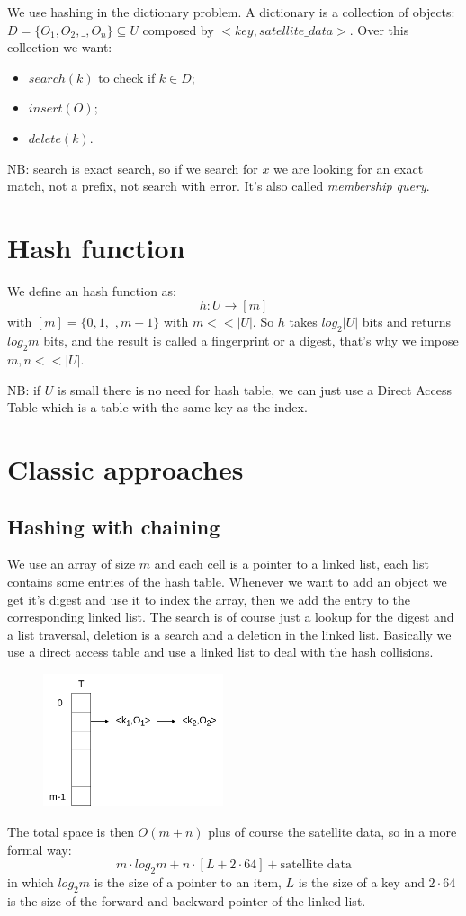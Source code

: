 We use hashing in the dictionary problem.
A dictionary is a collection of objects: $D = \{O_1, O_2, \_, O_n\} \subseteq U$ composed by $<key, satellite\_data>$.
Over this collection we want:
\begin{itemize}
    \item $search(k)$ to check if $k \in D$;
    \item $insert(O)$;
    \item $delete(k)$.
\end{itemize}

NB: search is exact search, so if we search for $x$ we are looking for an exact match, not a prefix, not search with error.
It's also called \emph{membership query}.

\section{Hash function}
We define an hash function as:
$$
    h : U \xrightarrow{} [m]
$$
with $[m] = \{0, 1, \_, m-1 \}$ with $m << |U|$.
So $h$ takes $log_2 |U|$ bits and returns $log_2 m$ bits, and the result is called a fingerprint or a digest, that's why we impose $m,n << |U|$.

NB: if $U$ is small there is no need for hash table, we can just use a Direct Access Table which is a table with the same key as the index.

\section{Classic approaches}
\subsection{Hashing with chaining}
We use an array of size $m$ and each cell is a pointer to a linked list, each list contains some entries of the hash table.
Whenever we want to add an object we get it's digest and use it to index the array, then we add the entry to the corresponding linked list.
The search is of course just a lookup for the digest and a list traversal, deletion is a search and a deletion in the linked list.
Basically we use a direct access table and use a linked list to deal with the hash collisions.
\begin{figure}[H]
    \centering
    \includegraphics[width=200px]{images/7_Hashing/chained_hashing.png}
\end{figure}
The total space is then $O(m+n)$ plus of course the satellite data, so in a more formal way:
$$
    m \cdot log_2 m + n \cdot [L + 2 \cdot 64] + \text{satellite data}
$$
in which $log_2 m$ is the size of a pointer to an item, $L$ is the size of a key and $2 \cdot 64$ is the size of the forward and backward pointer of the linked list.

